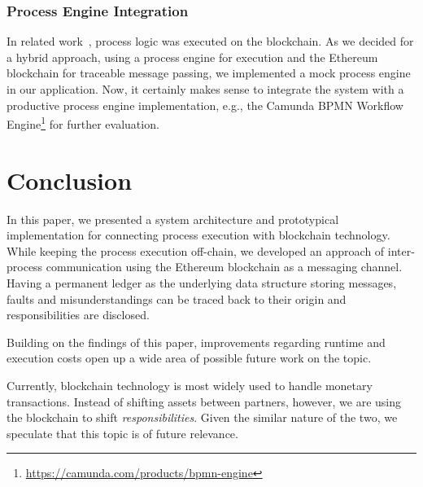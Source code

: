\documentclass[runningheads]{llncs}
\begin{document}
\subsubsection{Process Engine Integration}

In related work~\cite{lopez2017caterpillar}, process logic was executed on the blockchain.
As we decided for a hybrid approach, using a process engine for execution and the Ethereum blockchain for traceable message passing, we implemented a mock process engine in our application.
Now, it certainly makes sense to integrate the system with a productive process engine implementation, e.g., the Camunda BPMN Workflow Engine\footnote{\url{https://camunda.com/products/bpmn-engine}} for further evaluation.

\section{Conclusion} \label{conclusion}

In this paper, we presented a system architecture and prototypical implementation for connecting process execution with blockchain technology.
While keeping the process execution off-chain, we developed an approach of inter-process communication using the Ethereum blockchain as a messaging channel.
Having a permanent ledger as the underlying data structure storing messages, faults and misunderstandings can be traced back to their origin and responsibilities are disclosed.

Building on the findings of this paper, improvements regarding runtime and execution costs open up a wide area of possible future work on the topic.

Currently, blockchain technology is most widely used to handle monetary transactions.
Instead of shifting assets between partners, however, we are using the blockchain to shift \emph{responsibilities}.
Given the similar nature of the two, we speculate that this topic is of future relevance.
%
%
%


\end{document}
